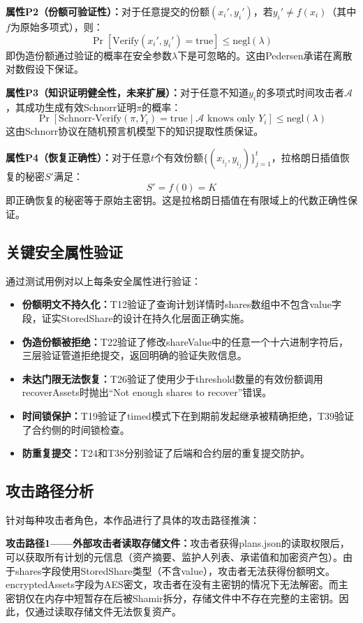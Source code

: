 \documentclass[UTF8,a4paper,zihao=-4,openany]{ctexrep}
\begin{document}
\textbf{属性P2（份额可验证性）：}对于任意提交的份额$(x_i', y_i')$，若$y_i' \neq f(x_i)$（其中$f$为原始多项式），则：
\[
\Pr[\text{Verify}(x_i', y_i') = \text{true}] \le \text{negl}(\lambda)
\]
即伪造份额通过验证的概率在安全参数$\lambda$下是可忽略的。这由Pedersen承诺在离散对数假设下保证。

\textbf{属性P3（知识证明健全性，未来扩展）：}对于任意不知道$y_i$的多项式时间攻击者$\mathcal{A}$，其成功生成有效Schnorr证明$\pi$的概率：
\[
\Pr[\text{Schnorr-Verify}(\pi, Y_i) = \text{true} \mid \mathcal{A} \text{ knows only } Y_i] \le \text{negl}(\lambda)
\]
这由Schnorr协议在随机预言机模型下的知识提取性质保证。

\textbf{属性P4（恢复正确性）：}对于任意$t$个有效份额$\{(x_{i_j}, y_{i_j})\}_{j=1}^{t}$，拉格朗日插值恢复的秘密$S'$满足：
\[
S' = f(0) = K
\]
即正确恢复的秘密等于原始主密钥。这是拉格朗日插值在有限域上的代数正确性保证。

\subsection{关键安全属性验证}

通过测试用例对以上每条安全属性进行验证：

\begin{itemize}
  \item \textbf{份额明文不持久化：}T12验证了查询计划详情时shares数组中不包含value字段，证实StoredShare的设计在持久化层面正确实施。
  \item \textbf{伪造份额被拒绝：}T22验证了修改shareValue中的任意一个十六进制字符后，三层验证管道拒绝提交，返回明确的验证失败信息。
  \item \textbf{未达门限无法恢复：}T26验证了使用少于threshold数量的有效份额调用recoverAssets时抛出“Not enough shares to recover”错误。
  \item \textbf{时间锁保护：}T19验证了timed模式下在到期前发起继承被精确拒绝，T39验证了合约侧的时间锁检查。
  \item \textbf{防重复提交：}T24和T38分别验证了后端和合约层的重复提交防护。
\end{itemize}

\subsection{攻击路径分析}

针对每种攻击者角色，本作品进行了具体的攻击路径推演：

\textbf{攻击路径1——外部攻击者读取存储文件：}攻击者获得plans.json的读取权限后，可以获取所有计划的元信息（资产摘要、监护人列表、承诺值和加密资产包）。由于shares字段使用StoredShare类型（不含value），攻击者无法获得份额明文。encryptedAssets字段为AES密文，攻击者在没有主密钥的情况下无法解密。而主密钥仅在内存中短暂存在后被Shamir拆分，存储文件中不存在完整的主密钥。因此，仅通过读取存储文件无法恢复资产。
\end{document}
